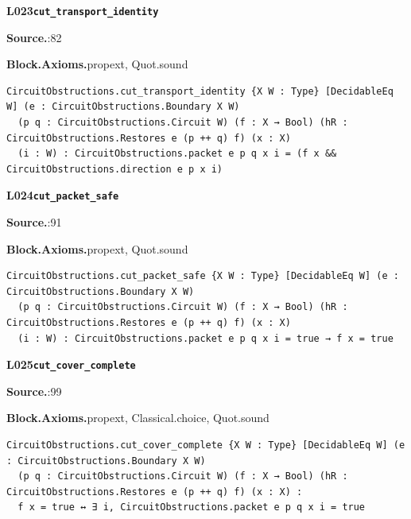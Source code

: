 \par\medskip\noindent\begin{minipage}{\textwidth}
{\small\bfseries L023\enspace\texttt{cut\_transport\_identity}\par}
{\footnotesize\raggedright\textbf{Source.}\enspace{}:82\par
\textbf{Block.}\quad\textbf{Axioms.}\enspace propext, Quot.sound\par}\nopagebreak
\begin{lstlisting}
CircuitObstructions.cut_transport_identity {X W : Type} [DecidableEq W] (e : CircuitObstructions.Boundary X W)
  (p q : CircuitObstructions.Circuit W) (f : X → Bool) (hR : CircuitObstructions.Restores e (p ++ q) f) (x : X)
  (i : W) : CircuitObstructions.packet e p q x i = (f x && CircuitObstructions.direction e p x i)
\end{lstlisting}
\end{minipage}\par

\par\medskip\noindent\begin{minipage}{\textwidth}
{\small\bfseries L024\enspace\texttt{cut\_packet\_safe}\par}
{\footnotesize\raggedright\textbf{Source.}\enspace{}:91\par
\textbf{Block.}\quad\textbf{Axioms.}\enspace propext, Quot.sound\par}\nopagebreak
\begin{lstlisting}
CircuitObstructions.cut_packet_safe {X W : Type} [DecidableEq W] (e : CircuitObstructions.Boundary X W)
  (p q : CircuitObstructions.Circuit W) (f : X → Bool) (hR : CircuitObstructions.Restores e (p ++ q) f) (x : X)
  (i : W) : CircuitObstructions.packet e p q x i = true → f x = true
\end{lstlisting}
\end{minipage}\par

\par\medskip\noindent\begin{minipage}{\textwidth}
{\small\bfseries L025\enspace\texttt{cut\_cover\_complete}\par}
{\footnotesize\raggedright\textbf{Source.}\enspace{}:99\par
\textbf{Block.}\quad\textbf{Axioms.}\enspace propext, Classical.choice, Quot.sound\par}\nopagebreak
\begin{lstlisting}
CircuitObstructions.cut_cover_complete {X W : Type} [DecidableEq W] (e : CircuitObstructions.Boundary X W)
  (p q : CircuitObstructions.Circuit W) (f : X → Bool) (hR : CircuitObstructions.Restores e (p ++ q) f) (x : X) :
  f x = true ↔ ∃ i, CircuitObstructions.packet e p q x i = true
\end{lstlisting}
\end{minipage}\par

